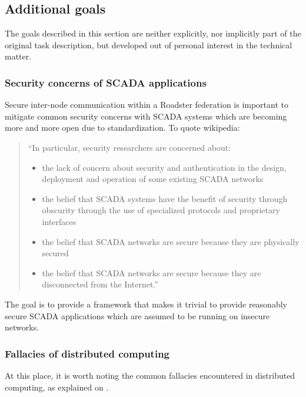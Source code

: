 \subsection{Additional goals}
The goals described in this section are neither explicitly, nor implicitly part
of the original task description, but developed out of personal interest in the
technical matter.

\subsubsection{Security concerns of SCADA applications}
Secure inter-node communication within a Roadster federation is important to
mitigate common security concerns with SCADA systems which are becoming more
and more open due to standardization. To quote \cite[Security issues]{wp:scada}
wikipedia:

\begin{quote}
``In particular, security researchers are concerned about:
	\begin{itemize}
		\item the lack of concern about security and authentication in
			the design, deployment and operation of some existing
			SCADA networks
		\item the belief that SCADA systems have the benefit of
			security through obscurity through the use of
			specialized protocols and proprietary interfaces
		\item the belief that SCADA networks are secure because they
			are physically secured
		\item the belief that SCADA networks are secure because they
			are disconnected from the Internet.''
	\end{itemize}
\end{quote}

The goal is to provide a framework that makes it trivial to provide reasonably
secure SCADA applications which are assumed to be running on insecure networks.

\subsubsection{Fallacies of distributed computing}
At this place, it is worth noting the common fallacies encountered in
distributed computing, as explained on \cite{dcomp:fallacies}.

